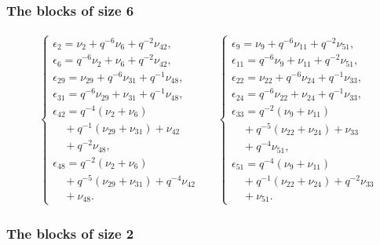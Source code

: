 \subsubsection{The blocks of size 6}

\begin{align*}
&\begin{cases}
\epsilon_{2} = \nu_{2} + q^{-6}\nu_{6} + q^{-2}\nu_{42},\\
\epsilon_{6} = q^{-6}\nu_{2} + \nu_{6} + q^{-2}\nu_{42},\\
\epsilon_{29} = \nu_{29} + q^{-6}\nu_{31} + q^{-1}\nu_{48},\\
\epsilon_{31} = q^{-6}\nu_{29} + \nu_{31} + q^{-1}\nu_{48},\\
\epsilon_{42} = q^{-4}(\nu_{2}+\nu_{6})\\
\quad+ q^{-1}(\nu_{29}+\nu_{31}) + \nu_{42}\\
\quad+ q^{-2}\nu_{48},\\
\epsilon_{48} = q^{-2}(\nu_{2}+\nu_{6})\\
\quad+ q^{-5}(\nu_{29}+\nu_{31}) + q^{-4}\nu_{42}\\
\quad+ \nu_{48}.
\end{cases}
&&\begin{cases}
\epsilon_{9} = \nu_{9} + q^{-6}\nu_{11} + q^{-2}\nu_{51},\\
\epsilon_{11} = q^{-6}\nu_{9} + \nu_{11} + q^{-2}\nu_{51},\\
\epsilon_{22} = \nu_{22} + q^{-6}\nu_{24} + q^{-1}\nu_{33},\\
\epsilon_{24} = q^{-6}\nu_{22} + \nu_{24} + q^{-1}\nu_{33},\\
\epsilon_{33} = q^{-2}(\nu_{9}+\nu_{11})\\
\quad+ q^{-5}(\nu_{22}+\nu_{24}) + \nu_{33}\\
\quad+ q^{-4}\nu_{51},\\
\epsilon_{51} = q^{-4}(\nu_{9}+\nu_{11})\\
\quad+ q^{-1}(\nu_{22}+\nu_{24}) + q^{-2}\nu_{33}\\
\quad+ \nu_{51}.
\end{cases}
\end{align*}

\subsubsection{The blocks of size 2}

